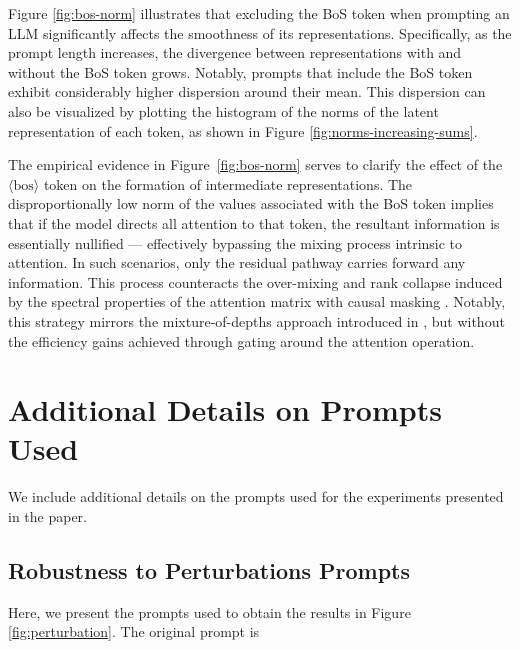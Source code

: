 \documentclass{article} %
\newcommand{\bos}{\ensuremath{\langle\text{bos}\rangle}\xspace}
\begin{document}
Figure \ref{fig:bos-norm} illustrates that excluding the BoS token when prompting an LLM significantly affects the smoothness of its representations. Specifically, as the prompt length increases, the divergence between representations with and without the BoS token grows. Notably, prompts that include the BoS token exhibit considerably higher dispersion around their mean. This dispersion can also be visualized by plotting the histogram of the norms of the latent representation of each token, as shown in Figure \ref{fig:norms-increasing-sums}. 

The empirical evidence in Figure \ref{fig:bos-norm} serves to clarify the effect of the \bos token on the formation of intermediate representations. The disproportionally low norm of the values associated with the BoS token implies that if the model directs all attention to that token, the resultant information is essentially nullified — effectively bypassing the mixing process intrinsic to attention.  In such scenarios, only the residual pathway carries forward any information. This process counteracts the over-mixing and rank collapse induced by the spectral properties of the attention matrix with causal masking \citep{naderi2024mind}. Notably, this strategy mirrors the mixture-of-depths approach introduced in \cite{raposo2024mixture}, but without the efficiency gains achieved through gating around the attention operation. %

\section{Additional Details on Prompts Used}
\label{app:prompts}

We include additional details on the prompts used for the experiments presented in the paper.

\subsection{Robustness to Perturbations Prompts}

Here, we present the prompts used to obtain the results in Figure \ref{fig:perturbation}. The original prompt is 
\end{document}
